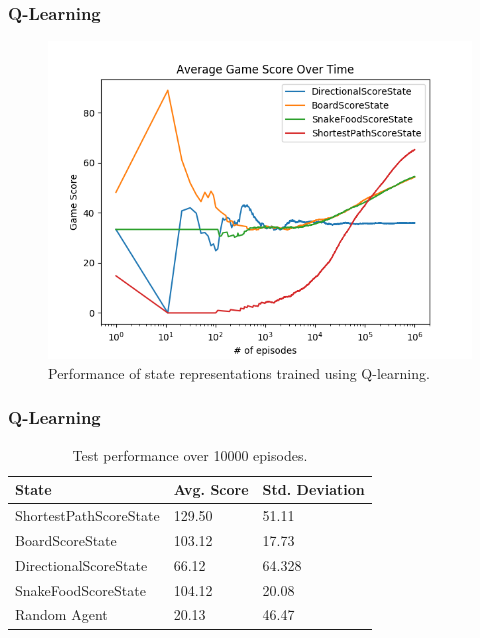 \documentclass{beamer}
\begin{document}
    \begin{frame}
        \frametitle{Q-Learning}
        \begin{figure}[ht]
            \centering
            \includegraphics[width=0.8\linewidth]{../images/qlearning/state/42/state_qlearning_average_game_score_over_time.png}
            \caption{Performance of state representations trained using Q-learning.}
            \label{fig:state_qlearning}
        \end{figure}
    \end{frame}

    \begin{frame}
        \frametitle{Q-Learning}
        \begin{table}[ht]
            \centering
            \begin{tabular}{ | l | l | l | }
                \hline
                State & Avg. Score & Std. Deviation \\ \hline
                ShortestPathScoreState & 129.50 & 51.11 \\ \hline
                BoardScoreState & 103.12 & 17.73 \\ \hline
                DirectionalScoreState & 66.12 & 64.328 \\ \hline
                SnakeFoodScoreState & 104.12 & 20.08 \\ \hline
                Random Agent & 20.13 & 46.47 \\
                \hline
            \end{tabular}
            \caption{Test performance over 10000 episodes.}
            \label{table:state_qlearning}
        \end{table}
    \end{frame}
\end{document}
